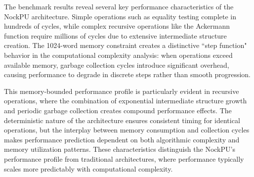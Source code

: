 \documentclass[twoside]{article}
\begin{document}
\begin{table}[h]
\centering
\caption{NockPU Performance Metrics: clock of 50MHz and 16,384 bytes of memory}
\label{tab:performance-metrics}
\end{table}

\noindent
The benchmark results reveal several key performance characteristics of the NockPU architecture. Simple operations such as equality testing complete in hundreds of cycles, while complex recursive operations like the Ackermann function require millions of cycles due to extensive intermediate structure creation. The 1024-word memory constraint creates a distinctive ``step function" behavior in the computational complexity analysis: when operations exceed available memory, garbage collection cycles introduce significant overhead, causing performance to degrade in discrete steps rather than smooth progression.

This memory-bounded performance profile is particularly evident in recursive operations, where the combination of exponential intermediate structure growth and periodic garbage collection creates compound performance effects. The deterministic nature of the architecture ensures consistent timing for identical operations, but the interplay between memory consumption and collection cycles makes performance prediction dependent on both algorithmic complexity and memory utilization patterns. These characteristics distinguish the NockPU's performance profile from traditional architectures, where performance typically scales more predictably with computational complexity.
\end{document}
